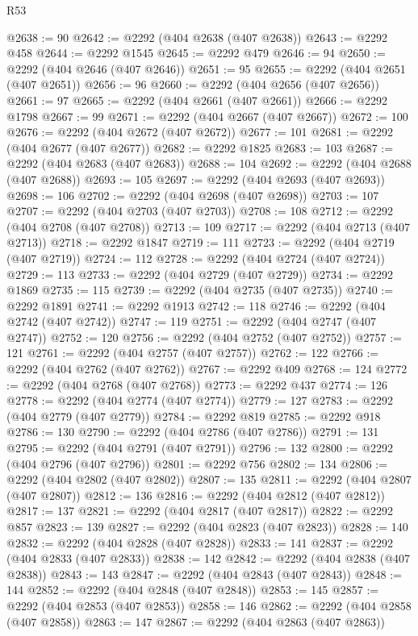 \begin{lexlean}{R53}
\begin{coremodule}
@2638 := 90
@2642 := @2292 (@404 @2638 (@407 @2638))
@2643 := @2292 @458
@2644 := @2292 @1545
@2645 := @2292 @479
@2646 := 94
@2650 := @2292 (@404 @2646 (@407 @2646))
@2651 := 95
@2655 := @2292 (@404 @2651 (@407 @2651))
@2656 := 96
@2660 := @2292 (@404 @2656 (@407 @2656))
@2661 := 97
@2665 := @2292 (@404 @2661 (@407 @2661))
@2666 := @2292 @1798
@2667 := 99
@2671 := @2292 (@404 @2667 (@407 @2667))
@2672 := 100
@2676 := @2292 (@404 @2672 (@407 @2672))
@2677 := 101
@2681 := @2292 (@404 @2677 (@407 @2677))
@2682 := @2292 @1825
@2683 := 103
@2687 := @2292 (@404 @2683 (@407 @2683))
@2688 := 104
@2692 := @2292 (@404 @2688 (@407 @2688))
@2693 := 105
@2697 := @2292 (@404 @2693 (@407 @2693))
@2698 := 106
@2702 := @2292 (@404 @2698 (@407 @2698))
@2703 := 107
@2707 := @2292 (@404 @2703 (@407 @2703))
@2708 := 108
@2712 := @2292 (@404 @2708 (@407 @2708))
@2713 := 109
@2717 := @2292 (@404 @2713 (@407 @2713))
@2718 := @2292 @1847
@2719 := 111
@2723 := @2292 (@404 @2719 (@407 @2719))
@2724 := 112
@2728 := @2292 (@404 @2724 (@407 @2724))
@2729 := 113
@2733 := @2292 (@404 @2729 (@407 @2729))
@2734 := @2292 @1869
@2735 := 115
@2739 := @2292 (@404 @2735 (@407 @2735))
@2740 := @2292 @1891
@2741 := @2292 @1913
@2742 := 118
@2746 := @2292 (@404 @2742 (@407 @2742))
@2747 := 119
@2751 := @2292 (@404 @2747 (@407 @2747))
@2752 := 120
@2756 := @2292 (@404 @2752 (@407 @2752))
@2757 := 121
@2761 := @2292 (@404 @2757 (@407 @2757))
@2762 := 122
@2766 := @2292 (@404 @2762 (@407 @2762))
@2767 := @2292 @409
@2768 := 124
@2772 := @2292 (@404 @2768 (@407 @2768))
@2773 := @2292 @437
@2774 := 126
@2778 := @2292 (@404 @2774 (@407 @2774))
@2779 := 127
@2783 := @2292 (@404 @2779 (@407 @2779))
@2784 := @2292 @819
@2785 := @2292 @918
@2786 := 130
@2790 := @2292 (@404 @2786 (@407 @2786))
@2791 := 131
@2795 := @2292 (@404 @2791 (@407 @2791))
@2796 := 132
@2800 := @2292 (@404 @2796 (@407 @2796))
@2801 := @2292 @756
@2802 := 134
@2806 := @2292 (@404 @2802 (@407 @2802))
@2807 := 135
@2811 := @2292 (@404 @2807 (@407 @2807))
@2812 := 136
@2816 := @2292 (@404 @2812 (@407 @2812))
@2817 := 137
@2821 := @2292 (@404 @2817 (@407 @2817))
@2822 := @2292 @857
@2823 := 139
@2827 := @2292 (@404 @2823 (@407 @2823))
@2828 := 140
@2832 := @2292 (@404 @2828 (@407 @2828))
@2833 := 141
@2837 := @2292 (@404 @2833 (@407 @2833))
@2838 := 142
@2842 := @2292 (@404 @2838 (@407 @2838))
@2843 := 143
@2847 := @2292 (@404 @2843 (@407 @2843))
@2848 := 144
@2852 := @2292 (@404 @2848 (@407 @2848))
@2853 := 145
@2857 := @2292 (@404 @2853 (@407 @2853))
@2858 := 146
@2862 := @2292 (@404 @2858 (@407 @2858))
@2863 := 147
@2867 := @2292 (@404 @2863 (@407 @2863))

\end{coremodule}
\end{lexlean}
